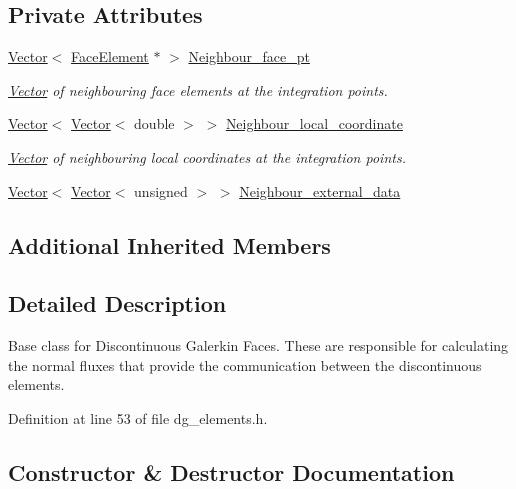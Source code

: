 \subsection*{Private Attributes}
\begin{DoxyCompactItemize}
\item 
\hyperlink{classoomph_1_1Vector}{Vector}$<$ \hyperlink{classoomph_1_1FaceElement}{Face\+Element} $\ast$ $>$ \hyperlink{classoomph_1_1DGFaceElement_a35240deb7d12eebe5e45e5e4ff2e9dae}{Neighbour\+\_\+face\+\_\+pt}
\begin{DoxyCompactList}\small\item\em \hyperlink{classoomph_1_1Vector}{Vector} of neighbouring face elements at the integration points. \end{DoxyCompactList}\item 
\hyperlink{classoomph_1_1Vector}{Vector}$<$ \hyperlink{classoomph_1_1Vector}{Vector}$<$ double $>$ $>$ \hyperlink{classoomph_1_1DGFaceElement_ad3fdd3f2199aa96f3d01422ac2ffe944}{Neighbour\+\_\+local\+\_\+coordinate}
\begin{DoxyCompactList}\small\item\em \hyperlink{classoomph_1_1Vector}{Vector} of neighbouring local coordinates at the integration points. \end{DoxyCompactList}\item 
\hyperlink{classoomph_1_1Vector}{Vector}$<$ \hyperlink{classoomph_1_1Vector}{Vector}$<$ unsigned $>$ $>$ \hyperlink{classoomph_1_1DGFaceElement_aa7fe8fcf78455ee3b01077607c91f483}{Neighbour\+\_\+external\+\_\+data}
\end{DoxyCompactItemize}
\subsection*{Additional Inherited Members}


\subsection{Detailed Description}
Base class for Discontinuous Galerkin Faces. These are responsible for calculating the normal fluxes that provide the communication between the discontinuous elements. 

Definition at line 53 of file dg\+\_\+elements.\+h.



\subsection{Constructor \& Destructor Documentation}
\mbox{\label{classoomph_1_1DGFaceElement_a6cfed44ec658ef834a27228a4b75e2fe}} 
